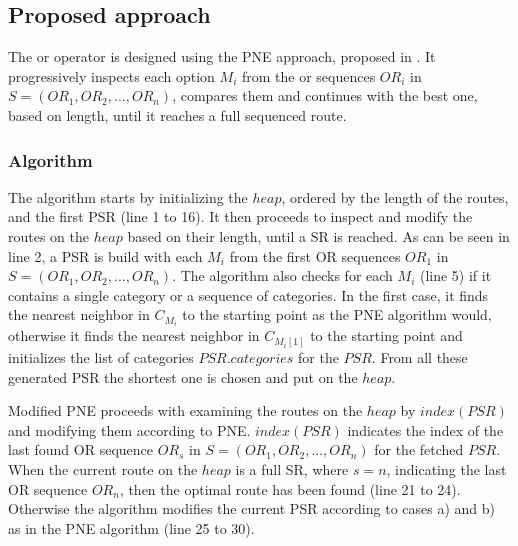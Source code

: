 
\subsection{Proposed approach} 
\label{sec:approachOr}
The or operator is designed using the PNE approach, proposed in \cite{OSR}. It progressively inspects each option $M_i$ from the or sequences $OR_i$ in \newline $S = (OR_1, OR_2, ..., OR_n)$, compares them and continues with the best one, based on length, until it reaches a full sequenced route.

\subsubsection{Algorithm}
\label{sec:algortihmOr}
The algorithm \texttt{} starts by initializing the $heap$, ordered by the length of the routes, and the first PSR (line 1 to 16). It then proceeds to inspect and modify the routes on the $heap$ based on their length, until a SR is reached. As can be seen in line 2, a PSR is build with each $M_i$ from the first OR sequences $OR_1$ in $S = (OR_1, OR_2, ..., OR_n)$. The algorithm also checks for each $M_i$ (line 5) if it contains a single category or a sequence of categories. In the first case, it finds the nearest neighbor in $C_{M_i}$ to the starting point as the PNE algorithm would, otherwise it finds the nearest neighbor in $C_{M_i[1]}$ to the starting point and initializes the list of categories $PSR.categories$ for the $PSR$. From all these generated PSR the shortest one is chosen and put on the $heap$.

Modified PNE proceeds with examining the routes on the $heap$ by $index(PSR)$ and modifying them according to PNE. $index(PSR)$ indicates the index of the last found OR sequence $OR_s$ in $S = (OR_1, OR_2, ..., OR_n)$ for the fetched $PSR$. When the current route on the $heap$ is a full SR, where $s = n$, indicating the last OR sequence $OR_n$, then the optimal route has been found (line 21 to 24). Otherwise the algorithm modifies the current PSR according to cases a) and b) as in the PNE algorithm (line 25 to 30). \newline

